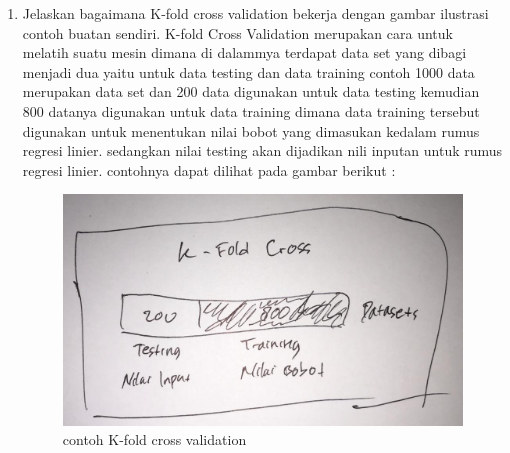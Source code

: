 \begin{enumerate}
\item Jelaskan bagaimana K-fold cross validation bekerja dengan gambar ilustrasi contoh buatan sendiri.
K-fold Cross Validation merupakan cara untuk melatih suatu mesin dimana di dalammya terdapat data set yang dibagi menjadi dua yaitu untuk data testing dan data training contoh 1000 data merupakan data set dan 200 data digunakan untuk data testing kemudian 800 datanya digunakan untuk data training dimana data training tersebut digunakan untuk menentukan nilai bobot yang dimasukan kedalam rumus regresi linier. sedangkan nilai testing akan dijadikan nili inputan untuk rumus regresi linier. contohnya dapat dilihat pada gambar berikut :
\begin{figure}[ht]
\centering
\includegraphics[scale=0.2]{figures/1174042/chapter2/1,7.jpeg}
\caption{contoh K-fold cross validation}
\label{contoh}
\end{figure}



\end{enumerate}
